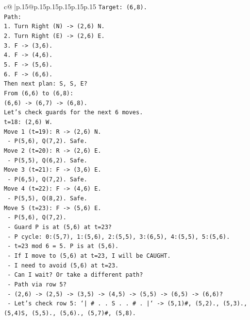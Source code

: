 \documentclass{article}
\begin{document}
{\begin{supertabular}{c@{$\;$}|p{.15\linewidth}@{}p{.15\linewidth}p{.15\linewidth}p{.15\linewidth}p{.15\linewidth}p{.15\linewidth}}
{{{\texttt{Target: (6,8).} \\
\texttt{Path:} \\
\texttt{1. Turn Right (N) {-}> (2,6) N.} \\
\texttt{2. Turn Right (E) {-}> (2,6) E.} \\
\texttt{3. F {-}> (3,6).} \\
\texttt{4. F {-}> (4,6).} \\
\texttt{5. F {-}> (5,6).} \\
\texttt{6. F {-}> (6,6).} \\
\texttt{Then next plan: S, S, E?} \\
\texttt{From (6,6) to (6,8):} \\
\texttt{(6,6) {-}> (6,7) {-}> (6,8).} \\
\texttt{Let's check guards for the next 6 moves.} \\
\texttt{t=18: (2,6) W.} \\
\texttt{Move 1 (t=19): R {-}> (2,6) N.} \\
\texttt{  {-} P(5,6), Q(7,2). Safe.} \\
\texttt{Move 2 (t=20): R {-}> (2,6) E.} \\
\texttt{  {-} P(5,5), Q(6,2). Safe.} \\
\texttt{Move 3 (t=21): F {-}> (3,6) E.} \\
\texttt{  {-} P(6,5), Q(7,2). Safe.} \\
\texttt{Move 4 (t=22): F {-}> (4,6) E.} \\
\texttt{  {-} P(5,5), Q(8,2). Safe.} \\
\texttt{Move 5 (t=23): F {-}> (5,6) E.} \\
\texttt{  {-} P(5,6), Q(7,2).} \\
\texttt{  {-} Guard P is at (5,6) at t=23?} \\
\texttt{  {-} P cycle: 0:(5,7), 1:(5,6), 2:(5,5), 3:(6,5), 4:(5,5), 5:(5,6).} \\
\texttt{  {-} t=23 mod 6 = 5. P is at (5,6).} \\
\texttt{  {-} If I move to (5,6) at t=23, I will be CAUGHT.} \\
\texttt{  {-} I need to avoid (5,6) at t=23.} \\
\texttt{  {-} Can I wait? Or take a different path?} \\
\texttt{  {-} Path via row 5?} \\
\texttt{  {-} (2,6) {-}> (2,5) {-}> (3,5) {-}> (4,5) {-}> (5,5) {-}> (6,5) {-}> (6,6)?} \\
\texttt{  {-} Let's check row 5: `| \# . . S . . \# . |` {-}> (5,1)\#, (5,2)., (5,3)., (5,4)S, (5,5)., (5,6)., (5,7)\#, (5,8).} \\
}}}
\end{supertabular}}
\end{document}
